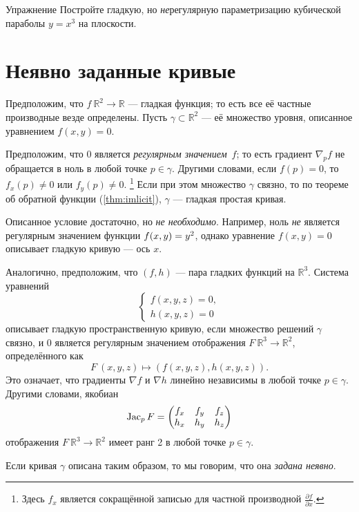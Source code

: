 \begin{thm}{Упражнение}\label{ex:nonregular}
Постройте гладкую, но \textit{не}регулярную параметризацию кубической параболы $y=x^3$ на плоскости.
\end{thm}

\section{Неявно заданные кривые}\label{sec:implicit-curves}

Предположим, что $f\:\mathbb{R}^2\to \mathbb{R}$ --- гладкая функция; 
то есть все её частные производные везде определены.
Пусть $\gamma\subset \mathbb{R}^2$ --- её множество уровня, описанное уравнением $f(x,y)=0$.

Предположим, что $0$ является \emph{регулярным значением}~$f$; то есть градиент $\nabla_p f$ не обращается в ноль в любой точке $p\in \gamma$.
Другими словами, если $f(p)=0$, то   
$f_x(p)\ne 0$ или $f_y(p)\ne 0$.%
\footnote{Здесь $f_x$ является сокращённой записью для частной производной
$\tfrac{\partial f}{\partial x}$.}
Если при этом множество $\gamma$ связно, то по теореме об обратной функции (\ref{thm:imlicit}), $\gamma$ --- гладкая простая кривая. 

Описанное условие достаточно, но \textit{не необходимо}.
Например, ноль \textit{не} является регулярным значением функции $f(x,y)\z=y^2$, однако уравнение $f(x,y)=0$ описывает гладкую кривую --- ось $x$.

Аналогично, предположим, что $(f,h)$ --- пара гладких функций на $\mathbb{R}^3$.
Система уравнений
\[\begin{cases}
   f(x,y,z)=0,
   \\
   h(x,y,z)=0
  \end{cases}
\]
описывает гладкую пространственную кривую, если множество решений $\gamma$ связно, и $0$ является регулярным значением отображения $F\:\mathbb{R}^3\to\mathbb{R}^2$, определённого как
\[F\:(x,y,z)\mapsto (f(x,y,z),h(x,y,z)).\]
Это означает, что градиенты $\nabla f$ и $\nabla h$ линейно независимы в любой точке $p\in \gamma$.
Другими словами, якобиан
\[\mathop{\rm Jac}\nolimits_pF=
\begin{pmatrix}
f_x&f_y&f_z\\
h_x&h_y&h_z
\end{pmatrix}
\]
отображения $F\:\mathbb{R}^3\to\mathbb{R}^2$ имеет ранг 2 в любой точке $p \in \gamma$.

Если кривая $\gamma$ описана таким образом,
то мы говорим, что она \emph{задана неявно}.

